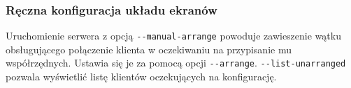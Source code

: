     \subsubsection{\label{sec:ManualConfig}Ręczna konfiguracja układu ekranów}
      Uruchomienie serwera z opcją \texttt{-{}-manual-arrange} powoduje zawieszenie wątku obsługującego połączenie klienta w oczekiwaniu na przypisanie mu współrzędnych. Ustawia się je za pomocą opcji \texttt{-{}-arrange}. \texttt{-{}-list-unarranged} pozwala wyświetlić listę klientów oczekujących na konfigurację.


